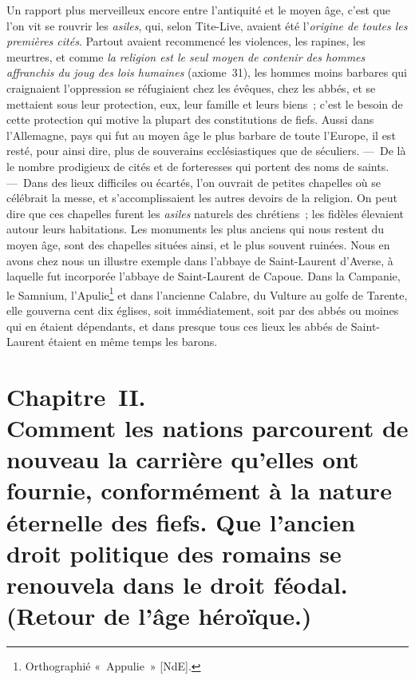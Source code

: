 \documentclass[french,twoside]{book} %
\newcommand\chapteropen{} %
\newcommand\chapterclose{} %
\begin{document}
Un rapport plus merveilleux encore entre l’antiquité et le moyen âge, c’est que l’on vit se rouvrir les {\itshape asiles}, qui, selon Tite-Live, avaient été l’\emph{{\itshape origine de toutes les premières cités}}. Partout avaient recommencé les violences, les rapines, les meurtres, et comme {\itshape la religion est le seul moyen de contenir des hommes affranchis du joug des lois humaines} (axiome 31), les hommes moins barbares qui craignaient l’oppression se réfugiaient chez les évêques, chez les abbés, et se mettaient sous leur protection, eux, leur famille et leurs biens ; c’est le besoin de cette protection qui motive la plupart des constitutions de fiefs. Aussi dans l’Allemagne, pays qui fut au moyen âge le plus barbare de toute l’Europe, il est resté, pour ainsi dire, plus de souverains ecclésiastiques que de séculiers. — De là le nombre prodigieux de cités et de forteresses qui portent des noms de saints. — Dans des lieux difficiles ou écartés, l’on ouvrait de petites chapelles où se célébrait la messe, et s’accomplissaient les autres devoirs de la religion. On peut dire que ces chapelles furent les {\itshape asiles} naturels des chrétiens ; les fidèles élevaient autour leurs habitations. Les monuments les plus anciens qui nous restent du moyen âge, sont des chapelles situées ainsi, et le  plus souvent ruinées. Nous en avons chez nous un illustre exemple dans l’abbaye de Saint-Laurent d’Averse, à laquelle fut incorporée l’abbaye de Saint-Laurent de Capoue. Dans la Campanie, le Samnium, l’Apulie\footnote{Orthographié « Appulie » [NdE].} et dans l’ancienne Calabre, du Vulture au golfe de Tarente, elle gouverna cent dix églises, soit immédiatement, soit par des abbés ou moines qui en étaient dépendants, et dans presque tous ces lieux les abbés de Saint-Laurent étaient en même temps les barons.
\chapterclose


\chapteropen
\chapter[{Chapitre II. Comment les nations parcourent de nouveau la carrière qu’elles ont fournie, conformément à la nature éternelle des fiefs. Que l’ancien droit politique des romains se renouvela dans le droit féodal. (Retour de l’âge héroïque.)}]{Chapitre II. \\
Comment les nations parcourent de nouveau la carrière qu’elles ont fournie, conformément à la nature éternelle des fiefs. Que l’ancien droit politique des romains se renouvela dans le droit féodal. (Retour de l’âge héroïque.)}
\end{document}
